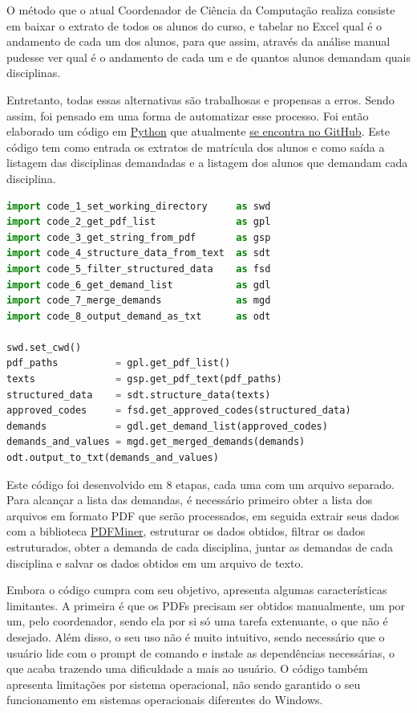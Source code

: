 O método que o atual Coordenador de Ciência da Computação realiza consiste em baixar o extrato de todos os alunos do curso, e tabelar no Excel qual é o andamento de cada um dos alunos, para que assim, através da análise manual pudesse ver qual é o andamento de cada um e de quantos alunos demandam quais disciplinas.

Entretanto, todas essas alternativas são trabalhosas e propensas a erros. Sendo assim, foi pensado em uma forma de automatizar esse processo. Foi então elaborado um código em \href{https://www.python.org/}{Python} que atualmente \href{https://github.com/jvfd3/university_demand}{se encontra no GitHub}. Este código tem como entrada os extratos de matrícula dos alunos e como saída a listagem das disciplinas demandadas e a listagem dos alunos que demandam cada disciplina.

\begin{lstlisting}[language=Python, caption={Obter demanda por extratos em PDF}]
import code_1_set_working_directory     as swd
import code_2_get_pdf_list              as gpl
import code_3_get_string_from_pdf       as gsp
import code_4_structure_data_from_text  as sdt
import code_5_filter_structured_data    as fsd
import code_6_get_demand_list           as gdl
import code_7_merge_demands             as mgd
import code_8_output_demand_as_txt      as odt

swd.set_cwd()
pdf_paths          = gpl.get_pdf_list()
texts              = gsp.get_pdf_text(pdf_paths)
structured_data    = sdt.structure_data(texts)
approved_codes     = fsd.get_approved_codes(structured_data)
demands            = gdl.get_demand_list(approved_codes)
demands_and_values = mgd.get_merged_demands(demands)
odt.output_to_txt(demands_and_values)
\end{lstlisting}

Este código foi desenvolvido em 8 etapas, cada uma com um arquivo separado. Para alcançar a lista das demandas, é necessário primeiro obter a lista dos arquivos em formato PDF que serão processados, em seguida extrair seus dados com a biblioteca \href{https://pypi.org/project/pdfminer/}{PDFMiner}, estruturar os dados obtidos, filtrar os dados estruturados, obter a demanda de cada disciplina, juntar as demandas de cada disciplina e salvar os dados obtidos em um arquivo de texto.

Embora o código cumpra com seu objetivo, apresenta algumas características limitantes. A primeira é que os PDFs precisam ser obtidos manualmente, um por um, pelo coordenador, sendo ela por si só uma tarefa extenuante, o que não é desejado. Além disso, o seu uso não é muito intuitivo, sendo necessário que o usuário lide com o prompt de comando e instale as dependências necessárias, o que acaba trazendo uma dificuldade a mais ao usuário. O código também apresenta limitações por sistema operacional, não sendo garantido o seu funcionamento em sistemas operacionais diferentes do Windows.

